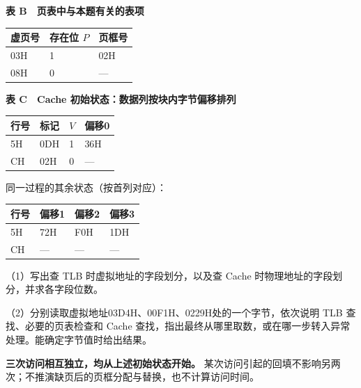 \begin{example}[配套例题]
\textbf{表 B　页表中与本题有关的表项}

\par\medskip\noindent\begin{minipage}{\linewidth}\fontsize{9.3}{12}\selectfont\begin{tabularx}{\linewidth}{@{}YYY@{}}
\toprule\noalign{}
虚页号 & 存在位 \(P\) & 页框号 \\
\midrule\noalign{}


03H & 1 & 02H \\
08H & 0 & --- \\
\bottomrule\end{tabularx}
\end{minipage}\par\medskip

\textbf{表 C　Cache 初始状态：数据列按块内字节偏移排列}

\begin{wideblock}\par\medskip\noindent\begin{minipage}{\linewidth}\fontsize{9.3}{12}\selectfont\begin{tabularx}{\linewidth}{@{}YYYY@{}}
\toprule\noalign{}
行号 & 标记 & \(V\) & 偏移0 \\
\midrule\noalign{}


5H & 0DH & 1 & 36H \\
CH & 02H & 0 & --- \\
\bottomrule\end{tabularx}
\end{minipage}\par\medskip\end{wideblock}

同一过程的其余状态（按首列对应）：

\begin{wideblock}\par\medskip\noindent\begin{minipage}{\linewidth}\fontsize{9.3}{12}\selectfont\begin{tabularx}{\linewidth}{@{}YYYY@{}}
\toprule\noalign{}
行号 & 偏移1 & 偏移2 & 偏移3 \\
\midrule\noalign{}


5H & 72H & F0H & 1DH \\
CH & --- & --- & --- \\
\bottomrule\end{tabularx}
\end{minipage}\par\medskip\end{wideblock}

（1）写出查 TLB 时虚拟地址的字段划分，以及查 Cache 时物理地址的字段划分，并求各字段位数。

（2）分别读取虚拟地址03D4H、00F1H、0229H处的一个字节，依次说明 TLB 查找、必要的页表检查和 Cache 查找，指出最终从哪里取数，或在哪一步转入异常处理。能确定字节值时给出结果。

\textbf{三次访问相互独立，均从上述初始状态开始。} 某次访问引起的回填不影响另两次；不推演缺页后的页框分配与替换，也不计算访问时间。

\end{example}

